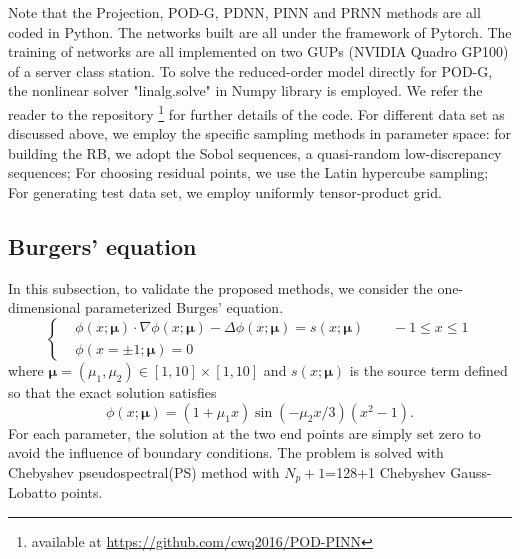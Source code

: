 \documentclass[preprint, 10pt]{elsarticle}
\begin{document}
Note that the Projection, POD-G, PDNN, PINN and PRNN methods are all coded in Python. The networks built are all under the framework of Pytorch. The training of networks are all  implemented on two GUPs (NVIDIA Quadro GP100) of a server class station. To solve the reduced-order model directly for POD-G, the nonlinear solver "linalg.solve" in  Numpy library is employed. We refer the reader to the repository \footnote{available at \url{https://github.com/cwq2016/POD-PINN}} for further details of the code. For different data set as discussed above, we employ the specific sampling methods in parameter space: for building the RB, we adopt the Sobol sequences, a quasi-random low-discrepancy sequences; For choosing residual points, we use the Latin hypercube sampling; For generating test data set, we employ uniformly tensor-product grid.


\subsection{Burgers' equation}
In this subsection, to validate the proposed methods, we consider the one-dimensional parameterized Burges' equation.
\begin{equation}
\left\{
\begin{aligned}
	 &\phi(x;\pmb{\mu}) \cdot \nabla \phi(x;\pmb{\mu}) -  \Delta \phi(x;\pmb{\mu})= s(x;\pmb{\mu})  \qquad -1 \le x \le 1\\
	 &\phi\left ( x= \pm1; \pmb {\mu} \right ) = 0
\end{aligned}\right.
\end{equation}
where $\pmb{\mu} =(\mu_1, \mu_2) \in [1,10] \times [1,10]$ and $s(x;\pmb{\mu})$ is the source term defined so that the exact solution satisfies
\begin{equation}
	\phi(x; \pmb{\mu}) = (1+\mu_1 x)\sin(-\mu_2 x/3) (x^2-1) .
\end{equation}
For each parameter, the solution at the two end points are simply set zero to avoid the influence of boundary conditions. The problem is solved with Chebyshev pseudospectral(PS) method with $N_p+1$=128+1 Chebyshev Gauss-Lobatto points.
\end{document}
